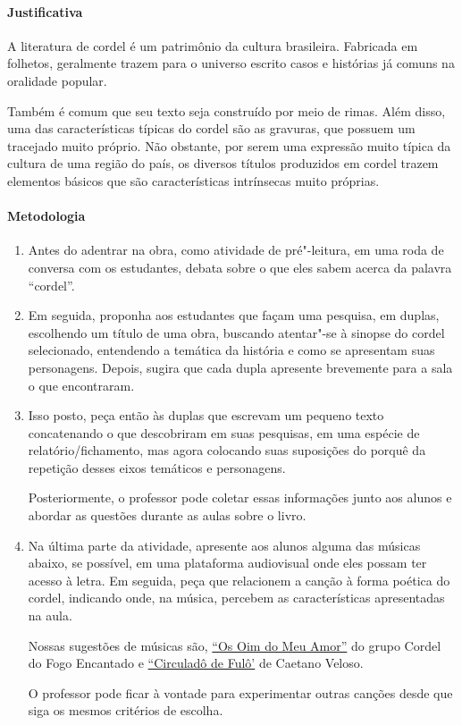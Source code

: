 \documentclass[12pt]{extarticle}
\begin{document}
\paragraph{Justificativa} A literatura de
cordel é um patrimônio da cultura brasileira. Fabricada em folhetos,
geralmente trazem para o universo escrito casos e histórias já comuns na
oralidade popular.

Também é comum que seu texto seja construído por meio
de rimas. Além disso, uma das características típicas do cordel são as
gravuras, que possuem um tracejado muito próprio. Não obstante, por
serem uma expressão muito típica da cultura de uma região do país, os
diversos títulos produzidos em cordel trazem elementos básicos que são
características intrínsecas muito próprias.

\paragraph{Metodologia}

\begin{enumerate}
\item
Antes do adentrar na obra, como atividade de pré"-leitura,
em uma roda de conversa com os estudantes, debata sobre o que eles 
sabem acerca da palavra ``cordel''.  

\item
Em seguida, proponha aos estudantes que façam uma pesquisa, em duplas, 
escolhendo um título de uma obra, buscando atentar"-se à sinopse do cordel selecionado, entendendo a temática da história e como se apresentam suas 
personagens. Depois, sugira que cada dupla apresente brevemente para a 
sala o que encontraram. 

\item
Isso posto, peça então às duplas que escrevam um pequeno texto 
concatenando o que descobriram em suas pesquisas, em uma espécie de 
relatório/fichamento, mas agora colocando suas suposições do 
porquê da repetição desses eixos temáticos e personagens. 

Posteriormente, o professor pode coletar essas informações
junto aos alunos e abordar as questões durante as aulas sobre o livro.

\item
Na última parte da atividade, apresente aos alunos alguma das músicas 
abaixo, se possível, em uma plataforma audiovisual onde eles possam ter 
acesso à letra. 
Em seguida, peça que relacionem a canção à forma poética do cordel, 
indicando onde, na música, percebem as características apresentadas na aula. 

Nossas sugestões de músicas são, \href{https://www.youtube.com/watch?v=S1eE0lGpi-c&ab_channel=CordeldoFogoEncantado}{``Os Oim do Meu Amor''} 
do grupo Cordel do Fogo Encantado e \href{https://www.youtube.com/watch?v=pPmQYbTE21M&ab_channel=CaetanoVeloso-Topic}{``Circuladô de Fulô'} de Caetano Veloso.

O professor pode ficar à vontade para experimentar outras canções desde 
que siga os mesmos critérios de escolha. 


\end{enumerate}
\end{document}
